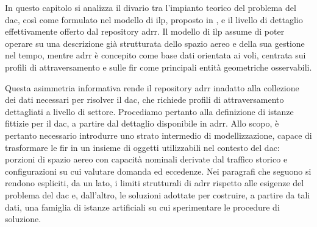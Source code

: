 \label{ch:ch5}
In questo capitolo si analizza il divario tra l’impianto teorico del problema del \gls{dac}, così come formulato nel modello di \gls{ilp}, proposto in \cite{galeazzo2024integer}, e il livello di dettaglio effettivamente offerto dal repository \gls{adrr}. Il modello di \gls{ilp} assume di poter operare su una descrizione già strutturata dello spazio aereo e della sua gestione nel tempo, mentre \gls{adrr} è concepito come base dati orientata ai voli, centrata sui profili di attraversamento e sulle \gls{fir} come principali entità geometriche osservabili.

Questa asimmetria informativa rende il repository \gls{adrr} inadatto alla collezione dei dati necessari per risolver il \gls{dac}, che richiede profili di attraversamento dettagliati a livello di settore. Procediamo pertanto alla definizione di istanze fittizie per il \gls{dac}, a partire dal dettaglio disponibile in \gls{adrr}. Allo scopo, è pertanto necessario introdurre uno strato intermedio di modellizzazione, capace di trasformare le \gls{fir} in un insieme di oggetti utilizzabili nel contesto del \gls{dac}: porzioni di spazio aereo con capacità nominali derivate dal traffico storico e configurazioni su cui valutare domanda ed eccedenze. Nei paragrafi che seguono si rendono espliciti, da un lato, i limiti strutturali di \gls{adrr} rispetto alle esigenze del problema del \gls{dac} e, dall’altro, le soluzioni adottate per costruire, a partire da tali dati, una famiglia di istanze artificiali su cui sperimentare le procedure di soluzione.

